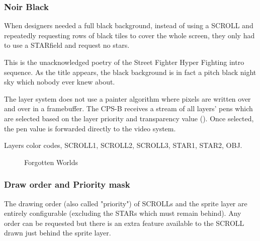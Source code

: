 \subsubsection{Noir Black}




When designers needed a full black background, instead of using a SCROLL and repeatedly requesting rows of black tiles to cover the whole screen, they only had to use a STARfield and request no stars. 

This is the unacknowledged poetry of the Street Fighter Hyper Fighting intro sequence. As the title appears, the black background is in fact a pitch black night sky which nobody ever knew about.

\begin{trivia}
The layer system does not use a painter algorithm where pixels are written over and over in a framebuffer. The CPS-B receives a stream of all layers' pens which are selected based on the layer priority and transparency value (). Once selected, the pen value is forwarded directly to the video system.
\end{trivia}


Layers color codes,  SCROLL1,  SCROLL2,  SCROLL3,  STAR1,  STAR2,  OBJ.

\vfill
\begin{figure}[!b]
 \caption*{Forgotten Worlds}%
 \end{figure}%
\pagebreak









\subsubsection{Draw order and Priority mask}\label{finalfight_trick}


The drawing order (also called "priority") of SCROLLs and the sprite layer are entirely configurable (excluding the STARs which must remain behind). Any order can be requested but there is an extra feature available to the SCROLL drawn just behind the sprite layer.

